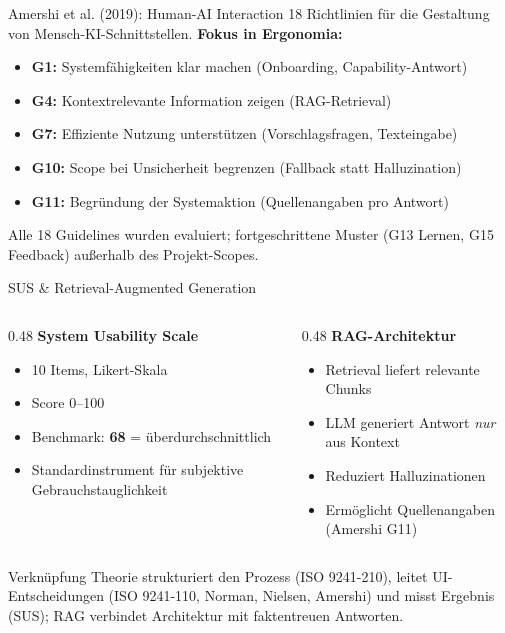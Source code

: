 \documentclass[14pt,aspectratio=169]{beamer}
\begin{document}
\begin{frame}{Amershi et al. (2019): Human-AI Interaction}
    18 Richtlinien für die Gestaltung von Mensch-KI-Schnittstellen. \textbf{Fokus in Ergonomia:}
    \begin{itemize}
        \item \textbf{G1:} Systemfähigkeiten klar machen (Onboarding, Capability-Antwort)
        \item \textbf{G4:} Kontextrelevante Information zeigen (RAG-Retrieval)
        \item \textbf{G7:} Effiziente Nutzung unterstützen (Vorschlagsfragen, Texteingabe)
        \item \textbf{G10:} Scope bei Unsicherheit begrenzen (Fallback statt Halluzination)
        \item \textbf{G11:} Begründung der Systemaktion (Quellenangaben pro Antwort)
    \end{itemize}
    \vspace{0.2cm}
    \small Alle 18 Guidelines wurden evaluiert; fortgeschrittene Muster (G13 Lernen, G15 Feedback) außerhalb des Projekt-Scopes.
\end{frame}

\begin{frame}{SUS \& Retrieval-Augmented Generation}
    \begin{columns}[T]
        \begin{column}{0.48\textwidth}
            \textbf{System Usability Scale}
            \begin{itemize}
                \item 10 Items, Likert-Skala
                \item Score 0--100
                \item Benchmark: \textbf{68} = überdurchschnittlich
                \item Standardinstrument für subjektive Gebrauchstauglichkeit
            \end{itemize}
        \end{column}
        \begin{column}{0.48\textwidth}
            \textbf{RAG-Architektur}
            \begin{itemize}
                \item Retrieval liefert relevante Chunks
                \item LLM generiert Antwort \textit{nur} aus Kontext
                \item Reduziert Halluzinationen
                \item Ermöglicht Quellenangaben (Amershi G11)
            \end{itemize}
        \end{column}
    \end{columns}
    \vspace{0.4cm}
    \begin{block}{Verknüpfung}
        Theorie strukturiert den Prozess (ISO 9241-210), leitet UI-Entscheidungen (ISO 9241-110, Norman, Nielsen, Amershi) und misst Ergebnis (SUS); RAG verbindet Architektur mit faktentreuen Antworten.
    \end{block}
\end{frame}
\end{document}
